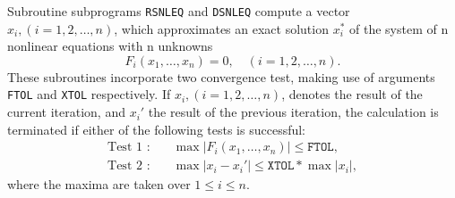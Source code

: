                           
     
                
                      
Subroutine subprograms {\tt RSNLEQ} and {\tt DSNLEQ} compute a vector
$x_i,(i=1,2,\ldots,n)$, which approximates an exact
solution $x_i^*$ of the
system of n nonlinear equations with n unknowns
$$ F_i(x_1,\ldots,x_n)=0,\quad (i=1,2,\ldots,n).$$
These subroutines incorporate two convergence test, making use of
arguments {\tt FTOL} and {\tt XTOL} respectively.
If $x_i,(i=1,2,\ldots,n)$, denotes
the result of the current iteration, and $x_i'$ the result of the
previous iteration, the calculation is terminated if either of the
following tests is successful:
$$\begin{array}{ll}
\mbox{Test 1 :} & \quad \max |F_i(x_1,\ldots,x_n)|\le \mathtt{FTOL,}\\
\mbox{Test 2 :} & \quad \max|x_i-x_i'| \le \mathtt{XTOL}*\max|x_i|,
\end{array}$$
where the maxima are taken over $ 1\le i\le n.$

